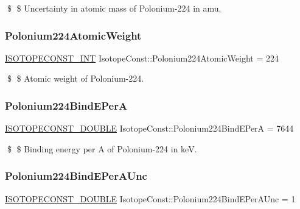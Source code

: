 \$ \$ Uncertainty in atomic mass of Polonium-\/224 in amu. \mbox{\label{group___isotope_const-_polonium-_po224_ga6310358f30f41c944de22b4fd02a2dc6}} 
\subsubsection{\texorpdfstring{Polonium224\+Atomic\+Weight}{Polonium224AtomicWeight}}
{\footnotesize\ttfamily \mbox{\hyperlink{group___isotope_const-_macros_ga5f18360b3e99483a35c32d789e62621c}{I\+S\+O\+T\+O\+P\+E\+C\+O\+N\+S\+T\+\_\+\+I\+NT}} Isotope\+Const\+::\+Polonium224\+Atomic\+Weight = 224}

\$ \$ Atomic weight of Polonium-\/224. \mbox{\label{group___isotope_const-_polonium-_po224_ga022bee7c2dea91fc568aa18be8fd9ffb}} 
\subsubsection{\texorpdfstring{Polonium224\+Bind\+E\+PerA}{Polonium224BindEPerA}}
{\footnotesize\ttfamily \mbox{\hyperlink{group___isotope_const-_macros_ga8f45a7272ce02c0b4c65c44636ed719a}{I\+S\+O\+T\+O\+P\+E\+C\+O\+N\+S\+T\+\_\+\+D\+O\+U\+B\+LE}} Isotope\+Const\+::\+Polonium224\+Bind\+E\+PerA = 7644}

\$ \$ Binding energy per A of Polonium-\/224 in keV. \mbox{\label{group___isotope_const-_polonium-_po224_ga7e411a13b2cdb09dbeda9b6b4f9aa2fc}} 
\subsubsection{\texorpdfstring{Polonium224\+Bind\+E\+Per\+A\+Unc}{Polonium224BindEPerAUnc}}
{\footnotesize\ttfamily \mbox{\hyperlink{group___isotope_const-_macros_ga8f45a7272ce02c0b4c65c44636ed719a}{I\+S\+O\+T\+O\+P\+E\+C\+O\+N\+S\+T\+\_\+\+D\+O\+U\+B\+LE}} Isotope\+Const\+::\+Polonium224\+Bind\+E\+Per\+A\+Unc = 1}

